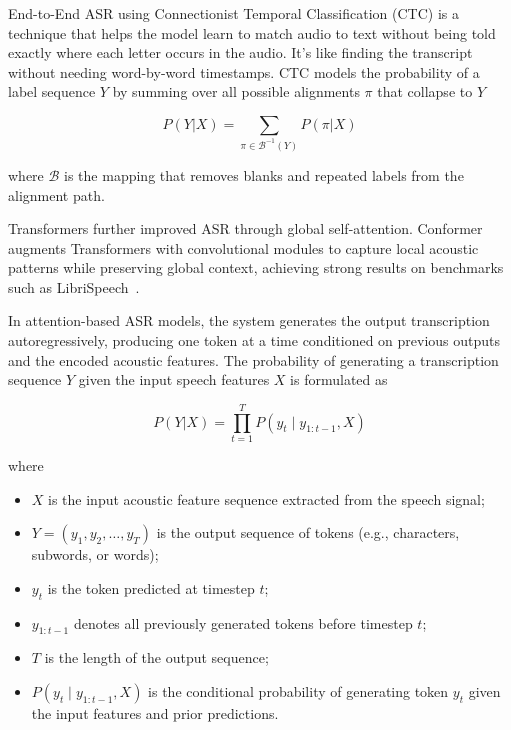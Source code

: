 End-to-End ASR using Connectionist Temporal Classification (CTC) is a technique that helps the model learn to match audio to text without being told exactly where each letter occurs in the audio. It's like finding the transcript without needing word-by-word timestamps. CTC models the probability of a label sequence $Y$ by summing over all possible alignments $\pi$ that collapse to $Y$

\begin{equation*}
    P(Y|X) = \sum_{\pi \in \mathcal{B}^{-1}(Y)} P(\pi|X)
\end{equation*}

where $\mathcal{B}$ is the mapping that removes blanks and repeated labels from the alignment path.


Transformers further improved ASR through global self-attention. Conformer augments Transformers with convolutional modules to capture local acoustic patterns while preserving global context, achieving strong results on benchmarks such as LibriSpeech~\cite{gulati2020conformer, panayotov2015librispeech}.

In attention-based ASR models, the system generates the output transcription autoregressively, producing one token at a time conditioned on previous outputs and the encoded acoustic features. The probability of generating a transcription sequence $Y$ given the input speech features $X$ is formulated as

\begin{equation*}
    P(Y|X) = \prod_{t=1}^{T} P(y_t \mid y_{1:t-1}, X)
\end{equation*}

where
\begin{itemize}
    \item $X$ is the input acoustic feature sequence extracted from the speech signal;
    \item $Y = (y_1, y_2, \dots, y_T)$ is the output sequence of tokens (e.g., characters, subwords, or words);
    \item $y_t$ is the token predicted at timestep $t$;
    \item $y_{1:t-1}$ denotes all previously generated tokens before timestep $t$;
    \item $T$ is the length of the output sequence;
    \item $P(y_t \mid y_{1:t-1}, X)$ is the conditional probability of generating token $y_t$ given the input features and prior predictions.
\end{itemize}

